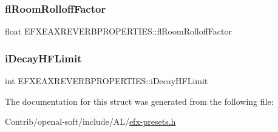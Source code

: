 \subsubsection{\texorpdfstring{fl\+Room\+Rolloff\+Factor}{flRoomRolloffFactor}}
{\footnotesize\ttfamily float E\+F\+X\+E\+A\+X\+R\+E\+V\+E\+R\+B\+P\+R\+O\+P\+E\+R\+T\+I\+E\+S\+::fl\+Room\+Rolloff\+Factor}

\mbox{\label{struct_e_f_x_e_a_x_r_e_v_e_r_b_p_r_o_p_e_r_t_i_e_s_a454d6bbeaeaf108414712439d36679ff}} 
\subsubsection{\texorpdfstring{i\+Decay\+H\+F\+Limit}{iDecayHFLimit}}
{\footnotesize\ttfamily int E\+F\+X\+E\+A\+X\+R\+E\+V\+E\+R\+B\+P\+R\+O\+P\+E\+R\+T\+I\+E\+S\+::i\+Decay\+H\+F\+Limit}



The documentation for this struct was generated from the following file\+:\begin{DoxyCompactItemize}
\item 
Contrib/openal-\/soft/include/\+A\+L/\mbox{\hyperlink{efx-presets_8h}{efx-\/presets.\+h}}\end{DoxyCompactItemize}

